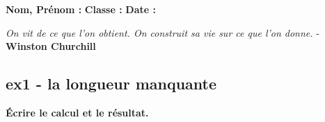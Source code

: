 \documentclass[11pt]{article}
\begin{document}

\newtheorem{Definition}{Définition}
\newtheorem{Theorem}{Théorème}
\newtheorem{Proposition}{Propriété}

\renewcommand{\labelitemi}{$\bullet$}
\renewcommand{\labelitemii}{$\circ$}
\newcommand{\Pointilles}[1][3]{%
  \multido{}{#1}{\makebox[\linewidth]{\dotfill}\\[\parskip]
}}


\setlength{\columnseprule}{1pt}

\textbf{Nom, Prénom :} \hspace{8cm} \textbf{Classe :} \hspace{3cm} \textbf{Date :}\\
\vspace{-0.2cm}
\begin{center}
  \textit{On vit de ce que l’on obtient. On construit sa vie sur ce que l’on donne.}  - \textbf{Winston Churchill}
\end{center}
\vspace{-0.2cm}


\subsection*{ex1 -  la longueur manquante}
\textbf{Écrire le calcul et le résultat.}
  
\end{document}
